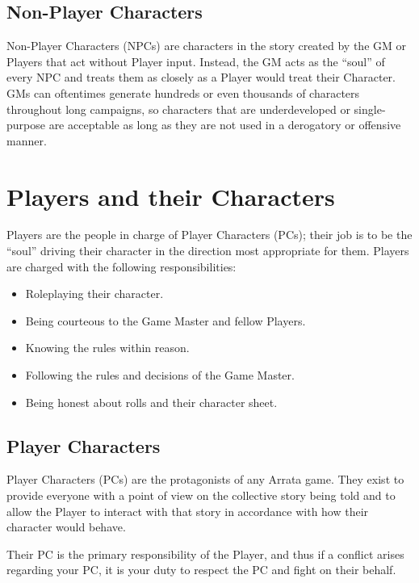 \documentclass[../main.tex]{subfiles}
\begin{document}
    \subsection{Non-Player Characters}
    Non-Player Characters (NPCs) are characters in the story created by the GM or Players that act without Player input. Instead, the GM acts as the ``soul'' of every NPC and treats them as closely as a Player would treat their Character. GMs can oftentimes generate hundreds or even thousands of characters throughout long campaigns, so characters that are underdeveloped or single-purpose are acceptable as long as they are not used in a derogatory or offensive manner.

    \section{Players and their Characters}

    Players are the people in charge of Player Characters (PCs); their job is to be the ``soul'' driving their character in the direction most appropriate for them. Players are charged with the following responsibilities:

    \begin{itemize}
        \item Roleplaying their character.
        \item Being courteous to the Game Master and fellow Players.
        \item Knowing the rules within reason.
        \item Following the rules and decisions of the Game Master.
        \item Being honest about rolls and their character sheet.
    \end{itemize}

    \subsection{Player Characters}

    Player Characters (PCs) are the protagonists of any Arrata game. They exist to provide everyone with a point of view on the collective story being told and to allow the Player to interact with that story in accordance with how their character would behave. 
    
    Their PC is the primary responsibility of the Player, and thus if a conflict arises regarding your PC, it is your duty to respect the PC and fight on their behalf.
\end{document}
